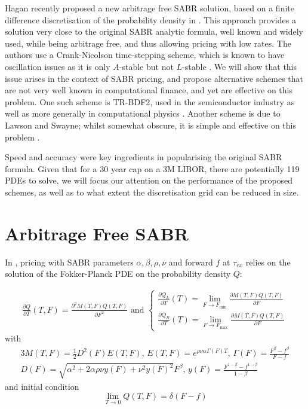 \documentclass[]{rAMF2e}
\begin{document}
Hagan recently proposed a new arbitrage free SABR solution, based on a finite difference discretisation of the probability density in \citep{hagan2013arbitrage}. This approach provides a solution very close to the original SABR analytic formula, well known and widely used, while being arbitrage free, and thus allowing pricing with low rates. The authors use a Crank-Nicolson time-stepping scheme, which is known to have oscillation issues \citep{duffy2004critique,GiCa2006} as it is only $A$-stable but not $L$-stable \citep{Le07}. We will show that this issue arises in the context of SABR pricing, and propose alternative schemes that are not very well known in computational finance, and yet are effective on this problem. One such scheme is TR-BDF2, used in the semiconductor industry as well as more generally in computational physics \citep{bank1985transient,bathe2005composite,edwards2011nonlinear, flavell2013conservative}. Another scheme is due to Lawson and Swayne; whilst somewhat obscure, it is simple and effective on this problem \citep{lawson1976simple}.  

Speed and accuracy were key ingredients in popularising the original SABR formula. Given that for a 30 year cap on a 3M LIBOR, there are potentially 119 PDEs to solve, we will focus our attention on the performance of the proposed schemes, as well as to what extent the discretisation grid can be reduced in size.



\section{Arbitrage Free SABR}
In \citep{hagan2013arbitrage}, pricing with SABR parameters $\alpha, \beta, \rho, \nu$ and forward $f$ at $\tau_{ex}$ relies on the solution of the Fokker-Planck PDE on the probability density $Q$:

\begin{align}\label{eqn_pde}
\frac{\partial Q}{\partial T}(T,F) = \frac{\partial^2 M(T,F) Q(T,F)}{\partial F^2} \text{ and } \begin{cases}
\frac{\partial Q_L}{\partial T}(T) = \lim_{F \to F_{\min}} \frac{\partial M(T,F) Q(T,F)}{\partial F}\\
\frac{\partial Q_R}{\partial T}(T) = \lim_{F \to F_{\max}} \frac{\partial M(T,F) Q(T,F)}{\partial F}
\end{cases}
\end{align}
with
\begin{alignat}{3}
M(T,F) = \frac{1}{2} D^2(F) E(T,F) \text{, } E(T,F) = e^{\rho\nu\alpha\Gamma(F) T} \text{, } \Gamma(F) = \frac{F^{\beta}-f^{\beta}}{F-f}\\
D(F) = \sqrt{\alpha^2 +2\alpha\rho\nu y(F)+ \nu^2 y(F)^2} F^{\beta} \text{, } y(F) = \frac{F^{1-\beta}-f^{1-\beta}}{1-\beta}
\end{alignat}
and initial condition 
\begin{equation}
\lim_{T \to 0} Q(T,F) = \delta (F - f)
\end{equation}
\end{document}
